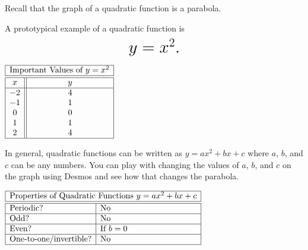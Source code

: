 \documentclass[nooutcomes]{ximera}
\begin{document}
Recall that the graph of a quadratic function is a parabola.

\begin{example}
A prototypical example of a quadratic function is $$ \mbox{\huge $y=x^2.$}$$

\begin{image}
\end{image}

\begin{center}
\(
\begin{array}{ |c || c|  }
 \hline
 \multicolumn{2}{|c|}{\text{\normalfont Important Values of } y=x^2} \\
\hline
 \hline
 x & y\\
 \hline
 -2&4\\
 -1&1\\
 0&0\\
 1&1\\
 2&4\\
 \hline
\end{array}
\)
\end{center}
\end{example}

In general, quadratic functions can be written as $y=ax^2+bx+c$ where $a$, $b$, and $c$ can be any numbers.  You can play with changing the values of $a$, $b$, and $c$ on the graph using Desmos and see how that changes the parabola.  

\begin{center}  
\end{center}

\begin{center}
$
\begin{array}{|l|l|}
 \hline
 \multicolumn{2}{|c|}{\text{\normalfont Properties of Quadratic Functions } y=ax^2 + bx + c} \\
\hline
 \hline
\text{Periodic?} & \text{No} \\ \hline
\text{Odd?} & \text{No} \\ \hline
\text{Even?} & \text{If } b = 0 \\ \hline
\text{One-to-one/invertible?} & \text{No}\\ \hline
\end{array}
$
\end{center}
\end{document}
